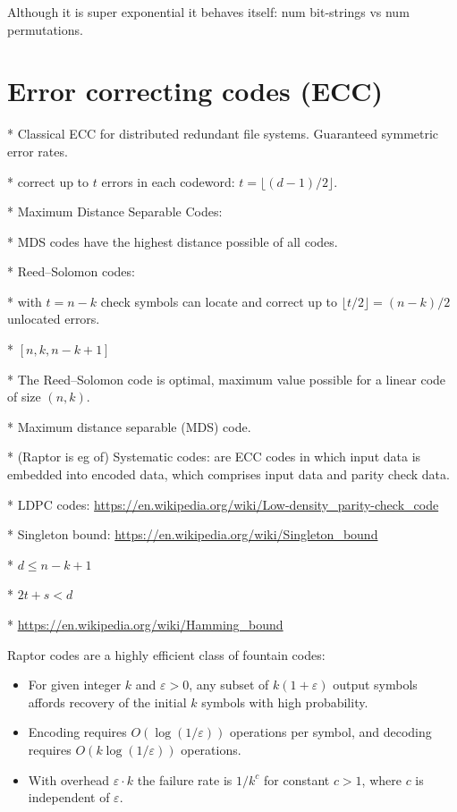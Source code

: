 Although it is super exponential it behaves itself: num bit-strings vs num permutations.

\section{Error correcting codes (ECC)}

* Classical ECC for distributed redundant file systems. Guaranteed symmetric error rates.

	* correct up to $t$ errors in each codeword: $t=\lfloor(d-1)/2\rfloor$. 

* Maximum Distance Separable Codes:

	* MDS codes have the highest distance possible of all codes.

* Reed–Solomon codes:

	* with $t=n-k$ check symbols can locate and correct up to $\lfloor t/2\rfloor = (n-k)/2$ unlocated errors.
	
	* $[n,k,n-k+1]$

	* The Reed–Solomon code is optimal, maximum value possible for a linear code of size $(n,k)$.

	* Maximum distance separable (MDS) code.

* (Raptor is eg of) Systematic codes: are ECC codes in which input data is embedded into encoded data, which comprises input data and parity check data.

* LDPC codes: \url{https://en.wikipedia.org/wiki/Low-density_parity-check_code}

* Singleton bound: \url{https://en.wikipedia.org/wiki/Singleton_bound}

	* $d\leq n-k+1$
	
	* $2t+s<d$

* \url{https://en.wikipedia.org/wiki/Hamming_bound}

Raptor codes  are a highly efficient class of fountain codes:
\begin{itemize}
	\item For given integer $k$ and $\varepsilon>0$, any subset of \mbox{$k(1+\varepsilon)$} output symbols affords recovery of the initial $k$ symbols with high probability.
	\item Encoding requires $O(\log(1/\varepsilon))$ operations per symbol, and decoding requires $O(k \log(1/\varepsilon))$ operations.
	\item With overhead $\varepsilon \cdot k$ the failure rate is $1/k^c$ for constant $c>1$, where $c$ is independent of $\varepsilon$.
\end{itemize}

